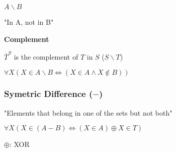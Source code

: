 \documentclass[12pt]{article}
\begin{document}
\begin{spacing}{1.5}
$A \backslash B$

"In A, not in B"

\textbf{Complement}

$\overline{T}^S$ is the complement of $T$ in $S$ ($S \backslash T$)

$\forall X (X \in A \backslash B \Leftrightarrow (X \in A \wedge X \notin B))$

\subsubsection{Symetric Difference ($-$)}

"Elements that belong in one of the sets but not both"

$\forall X (X \in (A - B) \Leftrightarrow (X \in A) \oplus X \in T)$

\begin{itemize*}
	\item $\oplus$: XOR
\end{itemize*}


\end{spacing}
\end{document}
